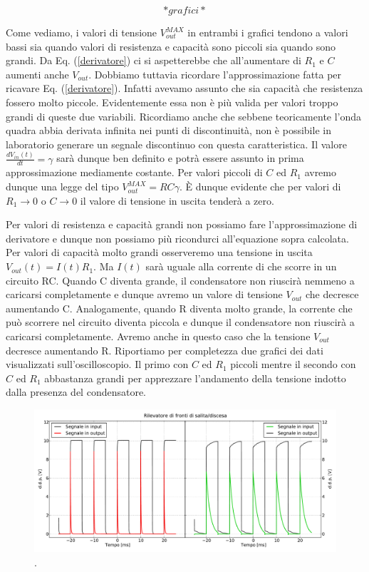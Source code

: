 $$*grafici*$$


Come vediamo, i valori di tensione $V_{out}^{MAX}$ in entrambi i grafici tendono a valori bassi sia quando valori di resistenza e capacità sono piccoli sia quando sono grandi. Da Eq. (\ref{derivatore}) ci si aspetterebbe che all'aumentare di $R_1$ e $C$ aumenti anche $V_{out}$. Dobbiamo tuttavia ricordare l'approssimazione fatta per ricavare Eq. (\ref{derivatore}). Infatti avevamo assunto che sia capacità che resistenza fossero molto piccole. Evidentemente essa non è più valida per valori troppo grandi di queste due variabili. Ricordiamo anche che sebbene teoricamente l'onda quadra abbia derivata infinita nei punti di discontinuità, non è possibile in laboratorio generare un segnale discontinuo con questa caratteristica. Il valore $\frac{dV_{in}(t)}{dt}=\gamma$  sarà dunque ben definito e potrà essere assunto in prima approssimazione mediamente costante. Per valori piccoli di $C$ ed $R_1$ avremo dunque una legge del tipo $V_{out}^{MAX}= RC \gamma$. \`E dunque evidente che per valori di $R_1\rightarrow 0$ o $C\rightarrow 0$ il valore di tensione in uscita tenderà a zero.

Per valori di resistenza e capacità grandi non possiamo fare l'approssimazione di derivatore e dunque non possiamo più ricondurci all'equazione sopra calcolata. Per valori di capacità molto grandi osserveremo una tensione in uscita $V_{out}(t)=I(t) R_1$. Ma $I(t)$ sarà uguale alla corrente di che scorre in un circuito RC. Quando C diventa grande, il condensatore non riuscirà nemmeno a caricarsi completamente e dunque avremo un valore di tensione $V_{out}$ che decresce aumentando C. Analogamente, quando R diventa molto grande, la corrente che può scorrere nel circuito diventa piccola e dunque il condensatore non riuscirà a caricarsi completamente. Avremo anche in questo caso che la tensione $V_{out}$ decresce aumentando R. Riportiamo per completezza due grafici dei dati visualizzati sull'oscilloscopio. Il primo con $C$ ed $R_1$ piccoli mentre il secondo con $C$ ed $R_1$ abbastanza grandi per apprezzare l'andamento della tensione indotto dalla presenza del condensatore. 


\begin{figure}[h]
\center
	\includegraphics[width=\textwidth]{peaks(2).pdf}
	\caption{.}
	\label{fig:peaks}
\end{figure}

